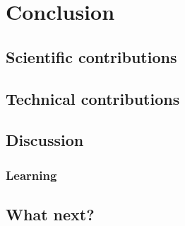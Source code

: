 \chapter{Conclusion}
\label{chapter|conclusion}

\section{Scientific contributions}
\label{sect|scientific-contributions}

\section{Technical contributions}
\label{sect|technical-contributions}

\section{Discussion}
\label{sect|discussion}

\subsection{Learning}
\label{sect|discussion-learning}

\section{What next?}
\label{sect|perspectives}



